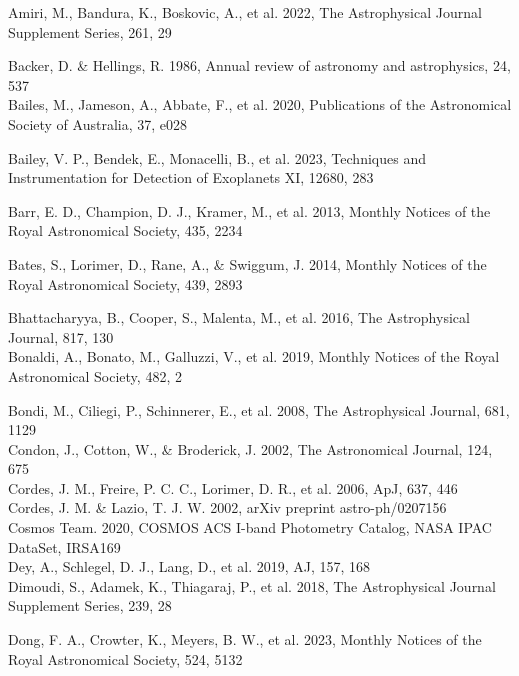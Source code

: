 \documentclass[10pt]{article}
\begin{document}
Amiri, M., Bandura, K., Boskovic, A., et al. 2022, The Astrophysical Journal Supplement Series, 261, 29

Backer, D. \& Hellings, R. 1986, Annual review of astronomy and astrophysics, 24, 537\\
Bailes, M., Jameson, A., Abbate, F., et al. 2020, Publications of the Astronomical Society of Australia, 37, e028

Bailey, V. P., Bendek, E., Monacelli, B., et al. 2023, Techniques and Instrumentation for Detection of Exoplanets XI, 12680, 283

Barr, E. D., Champion, D. J., Kramer, M., et al. 2013, Monthly Notices of the Royal Astronomical Society, 435, 2234

Bates, S., Lorimer, D., Rane, A., \& Swiggum, J. 2014, Monthly Notices of the Royal Astronomical Society, 439, 2893

Bhattacharyya, B., Cooper, S., Malenta, M., et al. 2016, The Astrophysical Journal, 817, 130\\
Bonaldi, A., Bonato, M., Galluzzi, V., et al. 2019, Monthly Notices of the Royal Astronomical Society, 482, 2

Bondi, M., Ciliegi, P., Schinnerer, E., et al. 2008, The Astrophysical Journal, 681, 1129\\
Condon, J., Cotton, W., \& Broderick, J. 2002, The Astronomical Journal, 124, 675\\
Cordes, J. M., Freire, P. C. C., Lorimer, D. R., et al. 2006, ApJ, 637, 446\\
Cordes, J. M. \& Lazio, T. J. W. 2002, arXiv preprint astro-ph/0207156\\
Cosmos Team. 2020, COSMOS ACS I-band Photometry Catalog, NASA IPAC DataSet, IRSA169\\
Dey, A., Schlegel, D. J., Lang, D., et al. 2019, AJ, 157, 168\\
Dimoudi, S., Adamek, K., Thiagaraj, P., et al. 2018, The Astrophysical Journal Supplement Series, 239, 28

Dong, F. A., Crowter, K., Meyers, B. W., et al. 2023, Monthly Notices of the Royal Astronomical Society, 524, 5132
\end{document}
